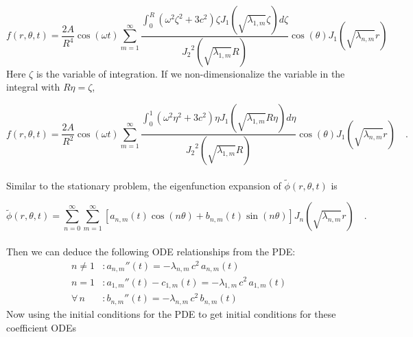 \documentclass{homework}
\begin{document}
\[ f(r, \theta , t) = \frac{2A}{R^4} \cos(\omega t) \sum^\infty_{m=1} \frac{\int^R_0 (\omega^2 \zeta^2 + 3c^2)  \zeta J_1 (\sqrt{\lambda_{1,m}} \zeta) d \zeta}{{J_2}^2 (\sqrt{\lambda_{1,m}} R) } \cos(\theta) J_1(\sqrt{\lambda_{n,m}} r)\]
\noindent
Here $\zeta$ is the variable of integration. If we non-dimensionalize the variable in the integral with $R \eta = \zeta$,

\[ f(r, \theta , t) = \frac{2A}{R^2} \cos(\omega t) \sum^\infty_{m=1} \frac{\int^1_0 (\omega^2 \eta^2 + 3c^2)  \eta J_1 (\sqrt{\lambda_{1,m}} R \eta) d \eta}{{J_2}^2 (\sqrt{\lambda_{1,m}} R) } \cos(\theta) J_1(\sqrt{\lambda_{n,m}} r) \quad .\]
\\ \noindent
Similar to the stationary problem, the eigenfunction expansion of $\tilde{\phi}(r, \theta , t)$ is

\[ \tilde{\phi}(r, \theta , t) = \sum^\infty_{n=0} \sum^\infty_{m=1} [a_{n,m}(t) \cos(n \theta) + b_{n,m}(t) \sin(n \theta) ] J_n (\sqrt{\lambda_{n,m}} r) \quad . \]
\\ \noindent
Then we can deduce the following ODE relationships from the PDE:
\begin{align*}
n \neq 1 &: a_{n,m}''(t) = -\lambda_{n,m} \, c^2 \, a_{n,m}(t) \\
n = 1 &: a_{1,m}''(t) - c_{1,m}(t) = -\lambda_{1,m} \, c^2 \, a_{1,m}(t) \\
\forall \, n &: b_{n,m}''(t) = -\lambda_{n,m} \, c^2 \, b_{n,m}(t)
\end{align*}
\noindent
Now using the initial conditions for the PDE to get initial conditions for these coefficient ODEs
\end{document}
